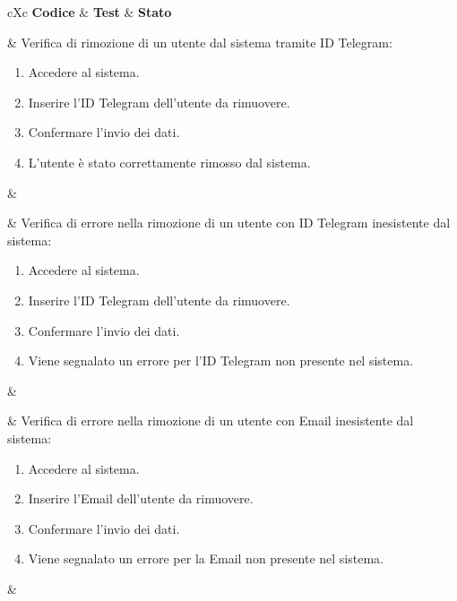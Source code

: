 \begin{table}[H]
	\begin{VTtable}[1.7]{\textwidth}{cXc}
		\rowcolor{\tablegray}
		\textbf{Codice} & \centering\textbf{Test} & \textbf{Stato} \\\toprule


        \addtotv & Verifica di rimozione di un utente dal sistema tramite ID Telegram:
        \begin{enumerate}
            \item Accedere al sistema.
            \item Inserire l'ID Telegram dell'utente da rimuovere.
            \item Confermare l'invio dei dati.
            \item L'utente è stato correttamente rimosso dal sistema.
        \end{enumerate}
        & \TNI \\\midrule

        \addtotv & Verifica di errore nella rimozione di un utente con ID Telegram inesistente dal sistema:
        \begin{enumerate}
            \item Accedere al sistema.
            \item Inserire l'ID Telegram dell'utente da rimuovere.
            \item Confermare l'invio dei dati.
            \item Viene segnalato un errore per l'ID Telegram non presente nel sistema.
        \end{enumerate}
        & \TNI \\\midrule

        \addtotv & Verifica di errore nella rimozione di un utente con Email inesistente dal sistema:
        \begin{enumerate}
            \item Accedere al sistema.
            \item Inserire l'Email dell'utente da rimuovere.
            \item Confermare l'invio dei dati.
            \item Viene segnalato un errore per la Email non presente nel sistema.
        \end{enumerate}
        & \TNI \\\midrule


\end{VTtable}
\end{table}
